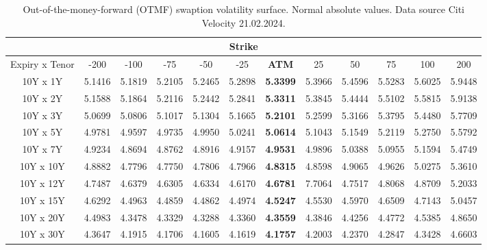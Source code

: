 \begin{table}[H]
    \centering
    \begin{tabular}{|c|c|c|c|c|c|c|c|c|c|c|c|}
        \hline  
            \multicolumn{12}{|c|}{Strike} \\ 
        \hline
        Expiry x Tenor& -200   & -100   & -75    & -50    & -25    & \textbf{ATM}    & 25     & 50     & 75     & 100    & 200    \\ 
        \hline
        10Y x 1Y  & 5.1416 & 5.1819 & 5.2105 & 5.2465 & 5.2898 & \textbf{5.3399} & 5.3966 & 5.4596 & 5.5283 & 5.6025 & 5.9448 \\
        10Y x 2Y  & 5.1588 & 5.1864 & 5.2116 & 5.2442 & 5.2841 & \textbf{5.3311} & 5.3845 & 5.4444 & 5.5102 & 5.5815 & 5.9138 \\
        10Y x 3Y  & 5.0699 & 5.0806 & 5.1017 & 5.1304 & 5.1665 & \textbf{5.2101} & 5.2599 & 5.3166 & 5.3795 & 5.4480 & 5.7709 \\
        10Y x 5Y  & 4.9781 & 4.9597 & 4.9735 & 4.9950 & 5.0241 & \textbf{5.0614} & 5.1043 & 5.1549 & 5.2119 & 5.2750 & 5.5792 \\
        10Y x 7Y  & 4.9234 & 4.8694 & 4.8762 & 4.8916 & 4.9157 & \textbf{4.9531} & 4.9896 & 5.0388 & 5.0955 & 5.1594 & 5.4749 \\
        10Y x 10Y & 4.8882 & 4.7796 & 4.7750 & 4.7806 & 4.7966 & \textbf{4.8315} & 4.8598 & 4.9065 & 4.9626 & 5.0275 & 5.3610 \\
        10Y x 12Y & 4.7487 & 4.6379 & 4.6305 & 4.6334 & 4.6170 & \textbf{4.6781} & 7.7064 & 4.7517 & 4.8068 & 4.8709 & 5.2033 \\
        10Y x 15Y & 4.6292 & 4.4963 & 4.4859 & 4.4862 & 4.4974 & \textbf{4.5247} & 4.5530 & 4.5970 & 4.6509 & 4.7143 & 5.0457 \\
        10Y x 20Y & 4.4983 & 4.3478 & 4.3329 & 4.3288 & 4.3360 & \textbf{4.3559} & 4.3846 & 4.4256 & 4.4772 & 4.5385 & 4.8650 \\
        10Y x 30Y & 4.3647 & 4.1915 & 4.1706 & 4.1605 & 4.1619 & \textbf{4.1757} & 4.2003 & 4.2370 & 4.2847 & 4.3428 & 4.6603 \\ 
        \hline
 \end{tabular}
    \caption{Out-of-the-money-forward (OTMF) swaption volatility surface. Normal absolute values.  Data source Citi Velocity  21.02.2024. }
    \label{tab:swaption_skew_OTMF}
\end{table}

